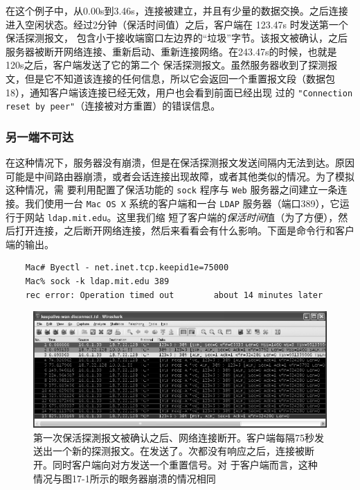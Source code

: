 在这个例子中，从0.00s到3.46s，连接被建立，并且有少量的数据交换。之后连接进入空闲状态。经过2分钟（保活时间值）之后，客户端在 123.47s 时发送第一个保活探测报文，
包含小于接收端窗口左边界的“垃圾”字节。该报文被确认，之后服务器被断开网络连接、重新启动、重新连接网络。在243.47s的时候，也就是120s之后，客户端发送了它的第二个
保活探测报文。虽然服务器收到了探测报文，但是它不知道该连接的任何信息，所以它会返回一个重置报文段（数据包18），通知客户端该连接已经无效，用户也会看到前面已经出现
过的 \verb|"Connection reset by peer"|（连接被对方重置）的错误信息。

\subsubsection{另一端不可达}
在这种情况下，服务器没有崩溃，但是在保活探测报文发送间隔内无法到达。原因可能是中间路由器崩溃，或者会话连接出现故障，或者其他类似的情况。为了模拟这种情况，需
要利用配置了保活功能的 \verb|sock| 程序与 \verb|Web| 服务器之间建立一条连接。我们使用一台 \verb|Mac OS X| 系统的客户端和一台 \verb|LDAP| 服务器（端口389），它运行于网站 \verb|ldap.mit.edu|。这里我们缩
短了客户端的\emph{保活时间}值（为了方便），然后打开连接，之后断开网络连接，然后来看看会有什么影响。下面是命令行和客户端的输出。

\begin{verbatim}
    Mac# Byectl - net.inet.tcp.keepid1e=75000
    Mac% sock -k ldap.mit.edu 389
    rec error: Operation timed out        about 14 minutes later
\end{verbatim}

\begin{figure}[!htb]
    \centering
	\includegraphics[width=1\textwidth]{imgs/17/17-3.png}
	\caption{第一次保活探測报文被确认之后、网络连接断开。客户端每隔75秒发送出一个新的探测报文。在发送了。次都没有响应之后，连接被断开。同时客户端向对方发送一个重置信号。对
    于客户端而言，这种情况与图17-1所示的眼务器崩溃的情况相同}
    \label{fig:17-3}
\end{figure}

